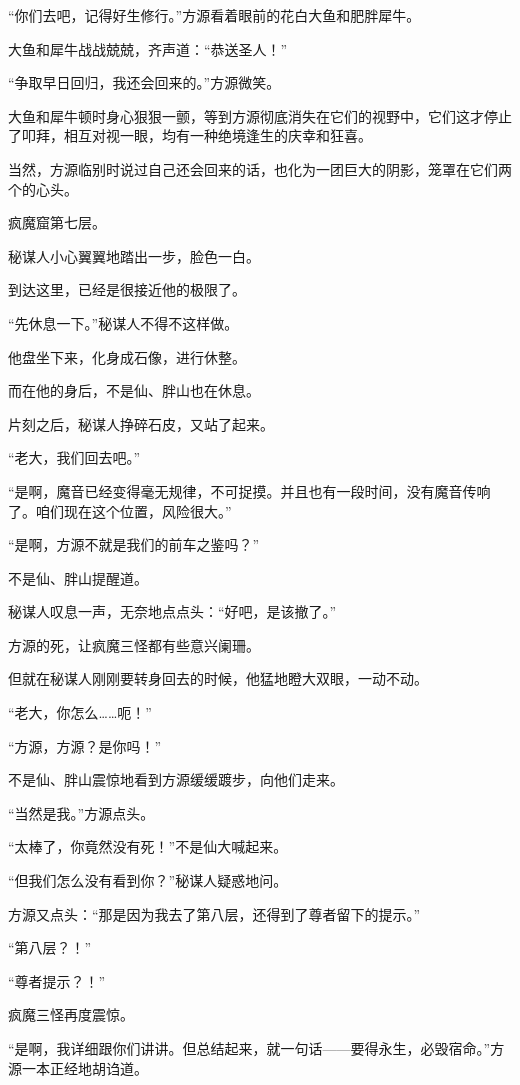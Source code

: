 \begin{this_body}
“你们去吧，记得好生修行。”方源看着眼前的花白大鱼和肥胖犀牛。

大鱼和犀牛战战兢兢，齐声道：“恭送圣人！”

“争取早日回归，我还会回来的。”方源微笑。

大鱼和犀牛顿时身心狠狠一颤，等到方源彻底消失在它们的视野中，它们这才停止了叩拜，相互对视一眼，均有一种绝境逢生的庆幸和狂喜。

当然，方源临别时说过自己还会回来的话，也化为一团巨大的阴影，笼罩在它们两个的心头。

疯魔窟第七层。

秘谋人小心翼翼地踏出一步，脸色一白。

到达这里，已经是很接近他的极限了。

“先休息一下。”秘谋人不得不这样做。

他盘坐下来，化身成石像，进行休整。

而在他的身后，不是仙、胖山也在休息。

片刻之后，秘谋人挣碎石皮，又站了起来。

“老大，我们回去吧。”

“是啊，魔音已经变得毫无规律，不可捉摸。并且也有一段时间，没有魔音传响了。咱们现在这个位置，风险很大。”

“是啊，方源不就是我们的前车之鉴吗？”

不是仙、胖山提醒道。

秘谋人叹息一声，无奈地点点头：“好吧，是该撤了。”

方源的死，让疯魔三怪都有些意兴阑珊。

但就在秘谋人刚刚要转身回去的时候，他猛地瞪大双眼，一动不动。

“老大，你怎么……呃！”

“方源，方源？是你吗！”

不是仙、胖山震惊地看到方源缓缓踱步，向他们走来。

“当然是我。”方源点头。

“太棒了，你竟然没有死！”不是仙大喊起来。

“但我们怎么没有看到你？”秘谋人疑惑地问。

方源又点头：“那是因为我去了第八层，还得到了尊者留下的提示。”

“第八层？！”

“尊者提示？！”

疯魔三怪再度震惊。

“是啊，我详细跟你们讲讲。但总结起来，就一句话——要得永生，必毁宿命。”方源一本正经地胡诌道。

\end{this_body}

